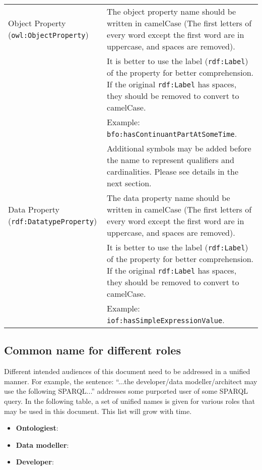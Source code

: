 \begin{enumerate}
\begin{tabular}{|>{\raggedright\arraybackslash}m{3.8cm}|>{\raggedright\arraybackslash}m{10cm}|}
Object Property (\texttt{owl:ObjectProperty}) & 
The object property name should be written in camelCase (The first letters of every word except the first word are in uppercase, and spaces are removed). \\
& It is better to use the label (\texttt{rdf:Label}) of the property for better comprehension. If the original \texttt{rdf:Label} has spaces, they should be removed to convert to camelCase. \\
& Example: \texttt{bfo:hasContinuantPartAtSomeTime}. \\
& Additional symbols may be added before the name to represent qualifiers and cardinalities. Please see details in the next section. \\ \hline

Data Property (\texttt{rdf:DatatypeProperty}) & 
The data property name should be written in camelCase (The first letters of every word except the first word are in uppercase, and spaces are removed). \\
& It is better to use the label (\texttt{rdf:Label}) of the property for better comprehension. If the original \texttt{rdf:Label} has spaces, they should be removed to convert to camelCase. \\
& Example: \texttt{iof:hasSimpleExpressionValue}. \\ \hline

\end{tabular}

\end{enumerate} 

\subsection*{Common name for different roles}
Different intended audiences of this document need to be addressed in a unified manner. For example, the sentence: ``...the developer/data modeller/architect may use the following SPARQL...'' addresses some purported user of some SPARQL query. In the following table, a set of unified names is given for various roles that may be used in this document. This list will grow with time. 

\begin{itemize}
    \item \textbf{Ontologiest}: 
    \item \textbf{Data modeller}:
    \item \textbf{Developer}:
\end{itemize}

